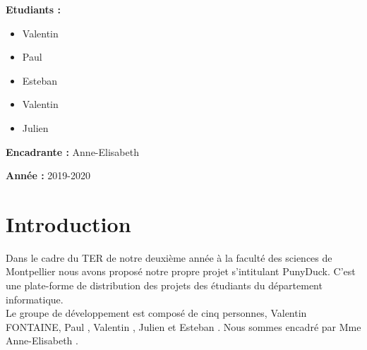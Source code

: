 \documentclass{report}
\begin{document}
\begin{titlepage}
\begin{minipage}[t]{8.5cm}
	\begin{flushleft}
	    \large{\textbf{Etudiants :}}
	    \begin{itemize}
	        \item \large{Valentin }
	        \item \large{Paul  } 
	        \item \large{Esteban }
	        \item \large{Valentin }
	        \item \large{Julien }
	    \end{itemize}
		\vspace{0.5cm}
		\large{\textbf{Encadrante :}}
		\large{Anne-Elisabeth } \\
	\end{flushleft}
\end{minipage}
\hfill
\begin{minipage}[t]{8cm}
	\begin{flushright} 
		\large{\textbf{Année :}} 
		\large{2019-2020}
	\end{flushright}
\end{minipage}
\end{titlepage}

\begin{titlepage}
\renewcommand{\contentsname}{Sommaire}
\large{\tableofcontents}
\thispagestyle{empty}
\end{titlepage}

\renewcommand{\chaptername}{Partie}



\chapter{Introduction} %
Dans le cadre du TER de notre deuxième année à la faculté des sciences de Montpellier nous avons proposé notre propre projet s'intitulant PunyDuck. C'est une plate-forme de distribution des projets des étudiants du département informatique.\\

Le groupe de développement est composé de cinq personnes, Valentin \textsc{FONTAINE}, Paul , Valentin , Julien  et Esteban . Nous sommes encadré par Mme Anne-Elisabeth .
\end{document}

